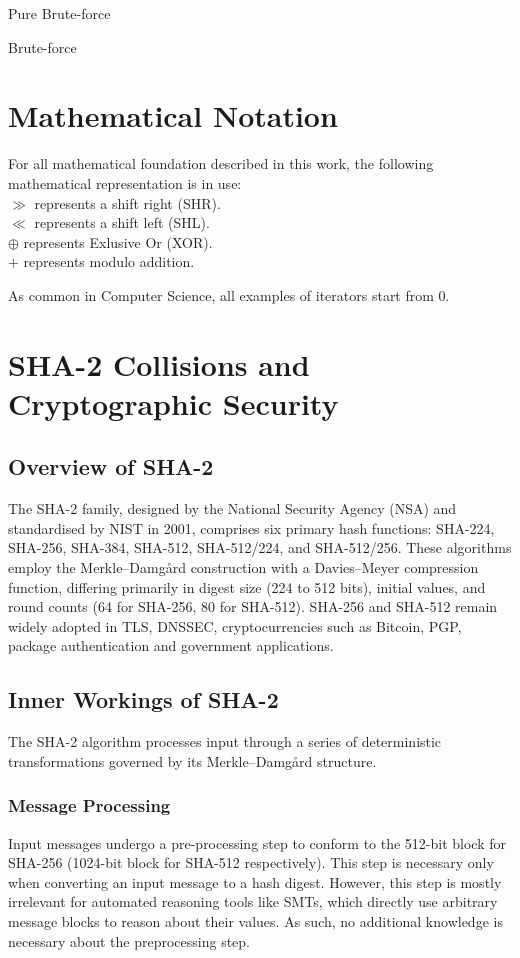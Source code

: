 \documentclass[a4paper]{report}
\begin{document}
\glsdesc{Pure Brute-force}

\glsdesc{Brute-force}

\section{Mathematical Notation}
\label{sec:math-notation}
For all mathematical foundation described in this work, the following mathematical representation is in use: \\
$\gg$ represents a shift right (SHR). \\
$\ll$ represents a shift left (SHL). \\
$\oplus$ represents Exlusive Or (XOR). \\
$+$ represents modulo addition.

As common in Computer Science, all examples of iterators start from 0.

\pagebreak
\section{SHA-2 Collisions and Cryptographic Security}
\subsection{Overview of SHA-2}
\label{ssec:sha2-info}
The SHA-2 family, designed by the National Security Agency (NSA) and standardised by NIST in 2001,
comprises six primary hash functions: SHA-224, SHA-256, SHA-384, SHA-512, SHA-512/224, and SHA-512/256.
These algorithms employ the Merkle–Damgård construction with a Davies–Meyer compression function,
differing primarily in digest size (224 to 512 bits), initial values, and round counts (64 for SHA-256, 80 for SHA-512). \cite{NIST_SP_180_4}
SHA-256 and SHA-512 remain widely adopted in TLS, DNSSEC, cryptocurrencies such as Bitcoin, PGP, package authentication and government applications. \cite{wiki:SHA2}

\subsection{Inner Workings of SHA-2}
The SHA-2 algorithm processes input through a series of deterministic transformations governed by its Merkle–Damgård structure.

\subsubsection{Message Processing}
Input messages undergo a pre-processing step to conform to the 512-bit block for SHA-256 (1024-bit block for SHA-512 respectively).
This step is necessary only when converting an input message to a hash digest.
However, this step is mostly irrelevant for automated reasoning tools like SMTs, which directly use arbitrary message blocks to reason about their values.
As such, no additional knowledge is necessary about the preprocessing step.
\end{document}
